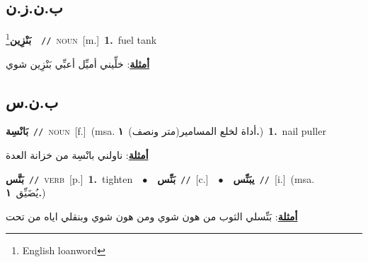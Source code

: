 \documentclass[10pt,a4paper,twoside]{article} %
\begin{document}
\begin{multicols}{2}
\vspace{-3mm}
\subsection*{\color{blue}\foreignlanguage{arabic}{ب.ن.ز.ن}\color{blue}{ (ntws)}} 

{\setlength\topsep{0pt}\textbf{\foreignlanguage{arabic}{بَنْزِين}}\footnote{English loanword}\ \ {\color{gray}\texttt{//}\color{black}}\ \textsc{noun}\ [m.]\ \textbf{1.}~fuel tank\  \begin{flushright}\color{gray}\foreignlanguage{arabic}{\textbf{\underline{\foreignlanguage{arabic}{أمثلة}}}: خلِّيني أميِّل أعبِّي بَنْزِين شوي}\end{flushright}\color{black}} \vspace{2mm}

\vspace{-3mm}
\subsection*{\color{blue}\foreignlanguage{arabic}{ب.ن.س}\color{blue}{}} 

{\setlength\topsep{0pt}\textbf{\foreignlanguage{arabic}{بَانْسِة}}\ {\color{gray}\texttt{//}\color{black}}\ \textsc{noun}\ [f.]\ \color{gray}(msa. \foreignlanguage{arabic}{أداة لخلع المسامير(متر ونصف)}~\foreignlanguage{arabic}{\textbf{١.}})\color{black}\ \textbf{1.}~nail puller\  \begin{flushright}\color{gray}\foreignlanguage{arabic}{\textbf{\underline{\foreignlanguage{arabic}{أمثلة}}}: ناولني بانْسِة من خزانة العدة}\end{flushright}\color{black}} \vspace{2mm}

{\setlength\topsep{0pt}\textbf{\foreignlanguage{arabic}{بَنَّس}}\ {\color{gray}\texttt{//}\color{black}}\ \textsc{verb}\ [p.]\ \textbf{1.}~tighten\ \ $\bullet$\ \ \setlength\topsep{0pt}\textbf{\foreignlanguage{arabic}{بَنِّس}}\ {\color{gray}\texttt{//}\color{black}}\ [c.]\ \ $\bullet$\ \ \setlength\topsep{0pt}\textbf{\foreignlanguage{arabic}{يبَنِّس}}\ {\color{gray}\texttt{//}\color{black}}\ [i.]\ \color{gray}(msa. \foreignlanguage{arabic}{يُضَيِّق}~\foreignlanguage{arabic}{\textbf{١.}})\color{black}\  \begin{flushright}\color{gray}\foreignlanguage{arabic}{\textbf{\underline{\foreignlanguage{arabic}{أمثلة}}}: بَنِّسلي الثوب من هون شوي ومن هون شوي وبنقلي اياه من تحت}\end{flushright}\color{black}} \vspace{2mm}


\end{multicols}
\end{document}
